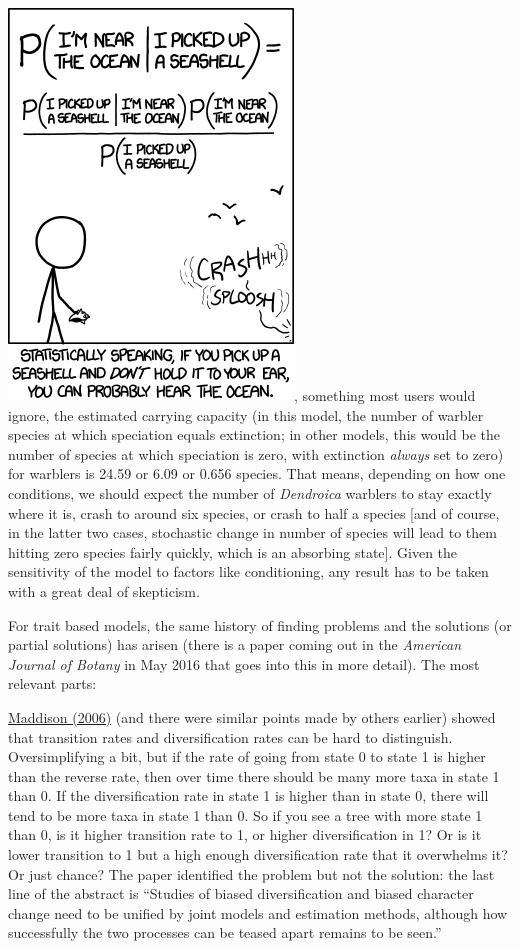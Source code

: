 \documentclass[
]{article}
\begin{document}
{  \includegraphics{images/seashell.png}}, something most users would ignore, the estimated carrying capacity (in this model, the number of warbler species at which speciation equals extinction; in other models, this would be the number of species at which speciation is zero, with extinction \emph{always} set to zero) for warblers is 24.59 or 6.09 or 0.656 species. That means, depending on how one conditions, we should expect the number of \emph{Dendroica} warblers to stay exactly where it is, crash to around six species, or crash to half a species {[}and of course, in the latter two cases, stochastic change in number of species will lead to them hitting zero species fairly quickly, which is an absorbing state{]}. Given the sensitivity of the model to factors like conditioning, any result has to be taken with a great deal of skepticism.

For trait based models, the same history of finding problems and the solutions (or partial solutions) has arisen (there is a paper coming out in the \emph{American Journal of Botany} in May 2016 that goes into this in more detail). The most relevant parts:

\href{http://onlinelibrary.wiley.com/doi/10.1111/j.0014-3820.2006.tb00517.x/abstract}{Maddison (2006)} (and there were similar points made by others earlier) showed that transition rates and diversification rates can be hard to distinguish. Oversimplifying a bit, but if the rate of going from state 0 to state 1 is higher than the reverse rate, then over time there should be many more taxa in state 1 than 0. If the diversification rate in state 1 is higher than in state 0, there will tend to be more taxa in state 1 than 0. So if you see a tree with more state 1 than 0, is it higher transition rate to 1, or higher diversification in 1? Or is it lower transition to 1 but a high enough diversification rate that it overwhelms it? Or just chance? The paper identified the problem but not the solution: the last line of the abstract is ``Studies of biased diversification and biased character change need to be unified by joint models and estimation methods, although how successfully the two processes can be teased apart remains to be seen.''
\end{document}
